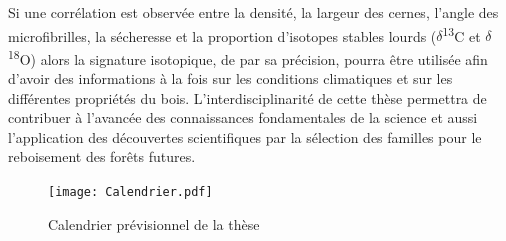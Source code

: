 \documentclass{report}
\newcommand{\Ctreize}{$\delta$\textsuperscript{13}C\xspace}
\newcommand{\Odixhuit}{$\delta$\textsuperscript{18}O\xspace}
\begin{document}
Si une corrélation est observée entre la densité, la largeur des cernes, l'angle des microfibrilles, la sécheresse et la proportion d'isotopes stables lourds (\Ctreize et \Odixhuit) alors la signature isotopique, de par sa précision, pourra être utilisée afin d'avoir des informations à la fois sur les conditions climatiques et sur les différentes propriétés du bois. L'interdisciplinarité de cette thèse permettra de contribuer à l'avancée des connaissances fondamentales de la science et aussi l'application des découvertes scientifiques par la sélection des familles pour le reboisement des forêts futures. \\

\clearpage
	
\begin{figure}
	\texttt{[image: Calendrier.pdf]}
	\caption{Calendrier prévisionnel de la thèse}
	\label{fig:calendrier}
	\end{figure}




\end{document}
